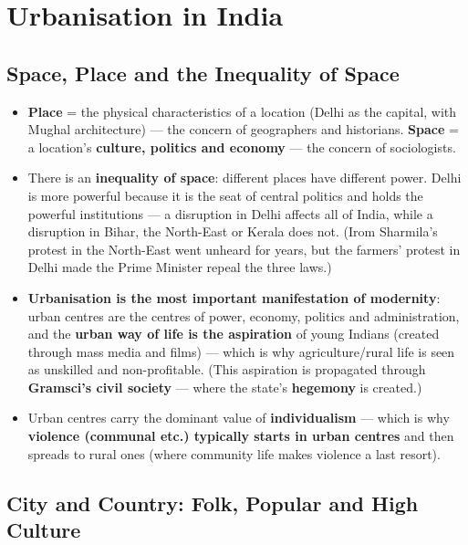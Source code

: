\chapter{Urbanisation in India}

\section{Space, Place and the Inequality of Space}

\begin{KeyConcept}
\begin{itemize}
\item \textbf{Place} = the physical characteristics of a location (Delhi as the capital, with Mughal architecture) --- the concern of geographers and historians. \textbf{Space} = a location's \textbf{culture, politics and economy} --- the concern of sociologists.
\item There is an \textbf{inequality of space}: different places have different power. Delhi is more powerful because it is the seat of central politics and holds the powerful institutions --- a disruption in Delhi affects all of India, while a disruption in Bihar, the North-East or Kerala does not. (Irom Sharmila's protest in the North-East went unheard for years, but the farmers' protest in Delhi made the Prime Minister repeal the three laws.)
\item \textbf{Urbanisation is the most important manifestation of modernity}: urban centres are the centres of power, economy, politics and administration, and the \textbf{urban way of life is the aspiration} of young Indians (created through mass media and films) --- which is why agriculture/rural life is seen as unskilled and non-profitable. (This aspiration is propagated through \textbf{Gramsci's civil society} --- where the state's \textbf{hegemony} is created.)
\item Urban centres carry the dominant value of \textbf{individualism} --- which is why \textbf{violence (communal etc.) typically starts in urban centres} and then spreads to rural ones (where community life makes violence a last resort).
\end{itemize}
\end{KeyConcept}

\section{City and Country: Folk, Popular and High Culture}

